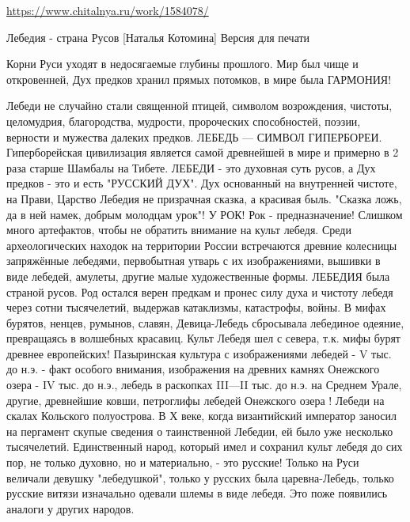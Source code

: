  
 

\url{https://www.chitalnya.ru/work/1584078/}

Лебедия - страна Русов
[Наталья Котомина]
 Версия для печати

Корни Руси уходят в недосягаемые глубины прошлого.
Мир был чище и  откровенней,   Дух предков хранил прямых потомков, в мире была ГАРМОНИЯ!
                                                                            
   Лебеди не случайно стали священной птицей, символом  возрождения, чистоты, целомудрия, благородства, мудрости, пророческих способностей, поэзии, верности и мужества далеких предков.
ЛЕБЕДЬ --- СИМВОЛ ГИПЕРБОРЕИ.
Гиперборейская цивилизация является самой древнейшей в мире и примерно в 2 раза старше Шамбалы на Тибете.
ЛЕБЕДИ - это духовная суть русов, а Дух предков - это и есть "РУССКИЙ ДУХ".
Дух основанный на внутренней чистоте,  на Прави,
Царство Лебедия  не  призрачная  сказка, а  красивая быль.
 "Сказка ложь, да в ней намек, добрым молодцам урок"!  У  РОК!
Рок - предназначение!
Слишком много  артефактов, чтобы не обратить внимание на культ лебедя.  
Среди археологических находок на территории России встречаются древние колесницы запряжённые лебедями, первобытная утварь с их изображениями, вышивки в виде лебедей, амулеты, другие малые художественные формы.
ЛЕБЕДИЯ была страной русов.
 Род остался верен предкам и пронес силу духа  и чистоту лебедя через сотни тысячелетий, выдержав катаклизмы, катастрофы, войны.   
В мифах бурятов, ненцев, румынов, славян, Девица-Лебедь сбросывала лебединое одеяние, превращаясь в волшебных красавиц.
Культ Лебедя шел с севера, т.к. мифы бурят древнее европейских!
Пазыринская культура с изображениями лебедей - V тыс. до н.э. - факт особого внимания,  изображения  на древних камнях Онежского озера -  IV тыс. до н.э.,  лебедь в раскопках III—II тыс. до н.э. на Среднем Урале, другие, древнейшие ковши,  петроглифы лебедей Онежского озера !
Лебеди на скалах Кольского полуострова.
В Х веке, когда византийский император заносил на пергамент скупые сведения о таинственной Лебедии, ей  было уже несколько тысячелетий. 
Единственный народ, который имел и сохранил культ лебедя до сих пор,  не только духовно, но и материально, - это русские!                      
Только на Руси величали девушку "лебедушкой", только у русских была царевна-Лебедь, только русские витязи изначально одевали шлемы в виде лебедя. Это поже появились аналоги у других народов.
